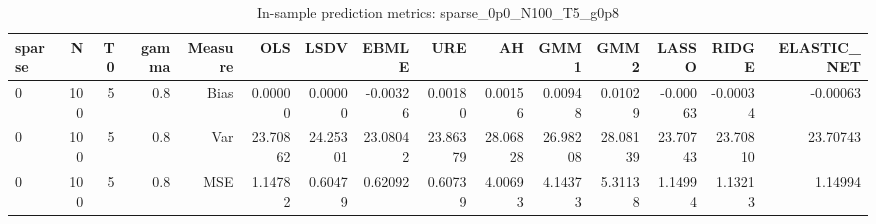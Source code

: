 \begin{table}[!htbp]\centering
\caption{In-sample prediction metrics: sparse_0p0_N100_T5_g0p8}
\label{tab:table2_sparse_0p0_N100_T5_g0p8}
\begin{tabular}{lrrrrrrrrrrrrrr}
\hline
sparse & N & T0 & gamma & Measure & OLS & LSDV & EBMLE & URE & AH & GMM1 & GMM2 & LASSO & RIDGE & ELASTIC_NET \\
\hline
0 & 100 & 5 & 0.8 & Bias & 0.00000 & 0.00000 & -0.00326 & 0.00180 & 0.00156 & 0.00948 & 0.01029 & -0.00063 & -0.00034 & -0.00063 \\
0 & 100 & 5 & 0.8 & Var & 23.70862 & 24.25301 & 23.08042 & 23.86379 & 28.06828 & 26.98208 & 28.08139 & 23.70743 & 23.70810 & 23.70743 \\
0 & 100 & 5 & 0.8 & MSE & 1.14782 & 0.60479 & 0.62092 & 0.60739 & 4.00693 & 4.14373 & 5.31138 & 1.14994 & 1.13213 & 1.14994 \\
\hline
\end{tabular}
\end{table}

